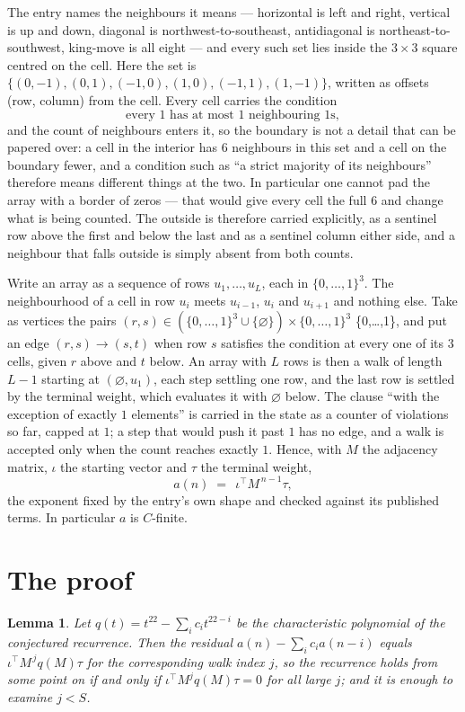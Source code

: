 \documentclass[11pt,a4paper]{article}
\theoremstyle{plain}
\newtheorem{lemma}[theorem]{Lemma}
\theoremstyle{definition}
\begin{document}
The entry names the neighbours it means --- horizontal is left and right, vertical is up and
down, diagonal is northwest-to-southeast, antidiagonal is northeast-to-southwest, king-move is
all eight --- and every such set lies inside the $3\times3$ square centred on the cell. Here
the set is $\{(0,-1), (0,1), (-1,0), (1,0), (-1,1), (1,-1)\}$, written as offsets (row, column) from the cell. Every cell carries
the condition
\[
\text{every 1 has at most 1 neighbouring 1s},
\]
and the count of neighbours enters it, so the boundary is not a detail that can be papered
over: a cell in the interior has $6$ neighbours in this set and a cell on the boundary
fewer, and a condition such as ``a strict majority of its neighbours'' therefore means
different things at the two. In particular one cannot pad the array with a border of zeros ---
that would give every cell the full $6$ and change what is being counted. The outside is
therefore carried
explicitly, as a sentinel row above the first and below the last and as a sentinel column
either side, and a neighbour that falls outside is simply absent from both counts.

Write an array as a sequence of rows $u_1,\dots,u_L$, each in
$\{0,\dots,1\}^{3}$. The neighbourhood of a cell in row $u_i$ meets $u_{i-1}$,
$u_i$ and $u_{i+1}$ and nothing else. Take as vertices the pairs
$(r,s)\in(\{0,\dots,1\}^{3}\cup\{\varnothing\})\times\{0,\dots,1\}^{3}$ \times \{0,\dots,1\},
and put an edge $(r,s)\to(s,t)$ when row $s$ satisfies the condition at every one of its
$3$ cells, given $r$ above and $t$ below. An array with $L$ rows is then a walk of length
$L-1$ starting at $(\varnothing,u_1)$, each step settling one row, and the last row is
settled by the terminal weight, which evaluates it with $\varnothing$ below. The clause ``with the exception of exactly $1$ elements'' is carried in
the state as a counter of violations so far, capped at $1$; a step that would push it past
$1$ has no edge, and a walk is accepted only when the count reaches exactly $1$. Hence,
with $M$ the adjacency matrix, $\iota$ the starting vector and $\tau$ the terminal weight,
\[
a(n)\;=\;\,\iota^{\!\top}M^{\,n-1}\tau ,
\]
the exponent fixed by the entry's own shape and checked against its published terms. In
particular $a$ is $C$-finite.

\section{The proof}

\begin{lemma}\label{lem:crit}
Let $q(t)=t^{22}-\sum_i c_it^{22-i}$ be the characteristic polynomial of the
conjectured recurrence. Then the residual $a(n)-\sum_ic_ia(n-i)$ equals
$\iota^{\!\top}M^{\,j}q(M)\tau$ for the corresponding walk index $j$, so the
recurrence holds from some point on if and only if $\iota^{\!\top}M^{j}q(M)\tau=0$ for all
large $j$; and it is enough to examine $j<S$.
\end{lemma}
\end{document}
